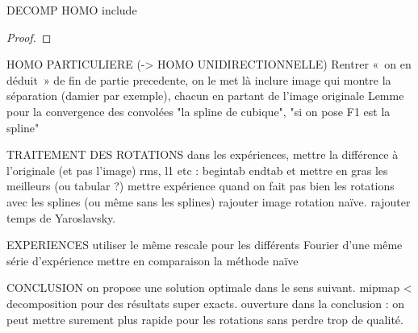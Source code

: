 DECOMP HOMO
	include \begin{proof} \end{proof}

HOMO PARTICULIERE (-> HOMO UNIDIRECTIONNELLE)
	Rentrer « on en déduit » de fin de partie precedente, on le met là
	inclure image qui montre la séparation (damier par exemple), chacun en partant de l'image originale
	Lemme pour la convergence des convolées
	"la spline de cubique", "si on pose F1 est la spline"

TRAITEMENT DES ROTATIONS
	dans les expériences, mettre la différence à l'originale (et pas l'image)
	rms, l1 etc : begin{tab} end{tab} et mettre en gras les meilleurs (ou tabular ?)
	mettre expérience quand on fait pas bien les rotations avec les splines (ou même sans les splines)
	rajouter image rotation naïve.
	rajouter temps de Yaroslavsky.
	

EXPERIENCES
	utiliser le même rescale pour les différents Fourier d'une même série d'expérience
	mettre en comparaison la méthode naïve

CONCLUSION
	on propose une solution optimale dans le sens suivant. mipmap < decomposition pour des résultats super exacts.
	ouverture dans la conclusion : on peut mettre surement plus rapide pour les rotations sans perdre trop de qualité.
